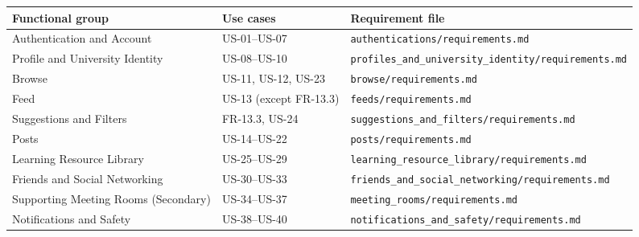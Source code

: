 \documentclass[12pt]{article}
\renewcommand{\baselinestretch}{1.5}
\begin{document}
\begingroup
\small
\renewcommand{\baselinestretch}{1.0}\selectfont
\renewcommand{\arraystretch}{1.15}
\setlength{\tabcolsep}{6pt}
\begin{longtable}{|>{\raggedright\arraybackslash}p{}|>{\raggedright\arraybackslash}p{}|>{\raggedright\arraybackslash}p{}|}
\hline
\textbf{Functional group} & \textbf{Use cases} & \textbf{Requirement file} \\ \hline
\endhead
Authentication and Account & US-01--US-07 & \texttt{\texttt{authentications/requirements.md}} \\ \hline
Profile and University Identity & US-08--US-10 & \texttt{\texttt{profiles\_and\_university\_identity/requirements.md}} \\ \hline
Browse & US-11, US-12, US-23 & \texttt{\texttt{browse/requirements.md}} \\ \hline
Feed & US-13 (except FR-13.3) & \texttt{\texttt{feeds/requirements.md}} \\ \hline
Suggestions and Filters & FR-13.3, US-24 & \texttt{\texttt{suggestions\_and\_filters/requirements.md}} \\ \hline
Posts & US-14--US-22 & \texttt{\texttt{posts/requirements.md}} \\ \hline
Learning Resource Library & US-25--US-29 & \texttt{\texttt{learning\_resource\_library/requirements.md}} \\ \hline
Friends and Social Networking & US-30--US-33 & \texttt{\texttt{friends\_and\_social\_networking/requirements.md}} \\ \hline
Supporting Meeting Rooms (Secondary) & US-34--US-37 & \texttt{\texttt{meeting\_rooms/requirements.md}} \\ \hline
Notifications and Safety & US-38--US-40 & \texttt{\texttt{notifications\_and\_safety/requirements.md}} \\ \hline
\end{longtable}
\endgroup
\par\medskip
\end{document}
